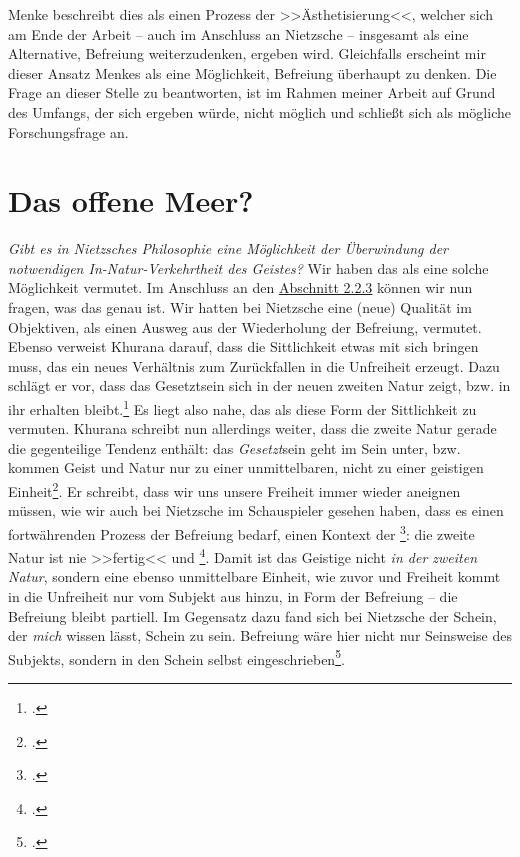 \documentclass[12pt, a4paper, openany]{report}
\begin{document}
Menke beschreibt dies als einen Prozess der >>Ästhetisierung<<, welcher sich am Ende der Arbeit -- auch im Anschluss an Nietzsche -- insgesamt als eine Alternative, Befreiung weiterzudenken, ergeben wird. 
Gleichfalls erscheint mir dieser Ansatz Menkes als eine Möglichkeit, Befreiung überhaupt zu denken. 
Die Frage an dieser Stelle zu beantworten, ist im Rahmen meiner Arbeit auf Grund des Umfangs, der sich ergeben würde, nicht möglich und schließt sich als mögliche Forschungsfrage an.

\section{Das offene Meer?}\label{abschnitt_4}
\textit{Gibt es in Nietzsches Philosophie eine Möglichkeit der Überwindung der notwendigen In-Natur-Verkehrtheit des Geistes?} 
Wir haben das  als eine solche Möglichkeit vermutet.
Im Anschluss an den \hyperref[abschnitt_2_3]{Abschnitt 2.2.3} können wir nun fragen, was das  genau ist.
Wir hatten bei Nietzsche eine (neue) Qualität im Objektiven, als einen Ausweg aus der Wiederholung der Befreiung, vermutet.
Ebenso verweist Khurana darauf, dass die Sittlichkeit etwas mit sich bringen muss, das ein neues Verhältnis zum Zurückfallen in die Unfreiheit erzeugt.
Dazu schlägt er vor, dass das Gesetztsein sich in der neuen zweiten Natur zeigt, bzw. in ihr erhalten bleibt.\footcite[Vgl.][401]{khurana_freiheit_2017}
Es liegt also nahe, das  als diese Form der Sittlichkeit zu vermuten. 
Khurana schreibt nun allerdings weiter, dass die zweite Natur gerade die gegenteilige Tendenz enthält: das \emph{Gesetzt}sein geht im Sein unter, bzw. kommen Geist und Natur nur zu einer unmittelbaren, nicht zu einer geistigen Einheit\footcite[Vgl.][402]{khurana_freiheit_2017}.
Er schreibt, dass wir uns unsere Freiheit immer wieder aneignen müssen, wie wir auch bei Nietzsche im Schauspieler gesehen haben, dass es einen fortwährenden Prozess der Befreiung bedarf, einen Kontext der \footcite[][402]{khurana_freiheit_2017}: 
die zweite Natur ist nie >>fertig<< und \footcite[][81]{menke_autonomie_2018}.
Damit ist das Geistige nicht \emph{in der zweiten Natur}, sondern eine ebenso unmittelbare Einheit, wie zuvor und Freiheit kommt in die Unfreiheit nur vom Subjekt aus hinzu, in Form der Befreiung -- die Befreiung bleibt partiell. 
Im Gegensatz dazu fand sich bei Nietzsche der Schein, der \emph{mich} wissen lässt, Schein zu sein. 
Befreiung wäre hier nicht nur Seinsweise des Subjekts, sondern in den Schein selbst eingeschrieben\footcite[Vgl.][339]{khurana_freiheit_2017}.
\end{document}
